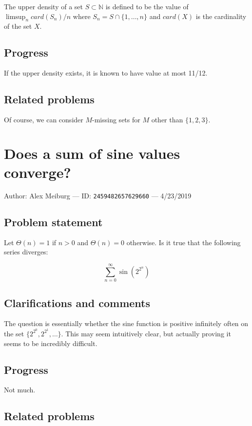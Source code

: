 \documentclass[10pt]{article}
\begin{document}
The upper density of a set $S\subset\mathbb{N}$ is defined to be the value of $\limsup_n card(S_n)/n$ where $S_n=S\cap\{1,\ldots,n\}$ and $card(X)$ is the cardinality of the set $X$.

\subsection{Progress}

If the upper density exists, it is known to have value at most 11/12.

\subsection{Related problems}

Of course, we can consider $M$-missing sets for $M$ other than $\{1,2,3\}$.

\pagebreak

\section{Does a sum of sine values converge?}

Author: Alex Meiburg --- ID: \verb`2459482657629660` --- 4/23/2019

\subsection{Problem statement}

Let $\Theta(n)=1$ if $n>0$ and $\Theta(n)=0$ otherwise. Is it true that the following series diverges:

$$\sum_{n=0}^\infty\sin(2^{2^n})$$

\subsection{Clarifications and comments}

The question is essentially whether the sine function is positive infinitely often on the set $\{2^{2^0},2^{2^1},\ldots\}$. This may seem intuitively clear, but actually proving it seems to be incredibly difficult.

\subsection{Progress}

Not much.

\subsection{Related problems}
\end{document}
